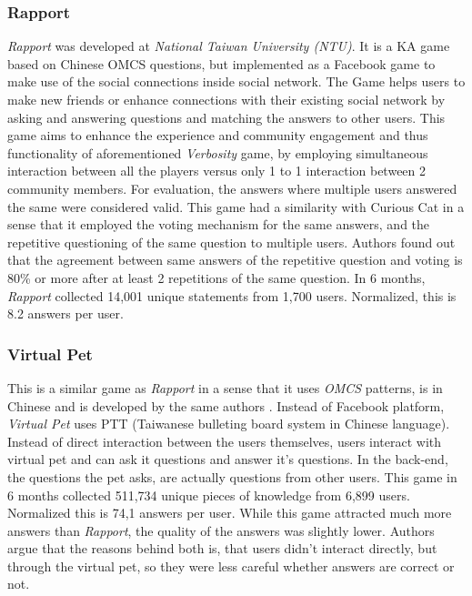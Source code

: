\subsubsection{Rapport}
\label{section:r:rapport} 
\emph{Rapport} was developed at \emph{National Taiwan University (NTU)}. It
is a KA game based on Chinese OMCS questions, but implemented as a 
Facebook game to make use of the social connections inside social network. 
The Game helps users to make new friends or enhance connections with their 
existing social network by asking and answering questions and matching the 
answers to other users\parencite{Kuo2009}. This game aims to enhance the 
experience and community engagement and thus functionality of aforementioned 
\emph{Verbosity} game, by employing simultaneous  interaction between all the 
players versus only 1 to 1 interaction between 2 community members. For 
evaluation, the answers where multiple users answered the same were considered 
valid. This game had a similarity with Curious Cat in a sense that it employed
the voting mechanism for the same answers, and the repetitive questioning of
the same question to multiple users. Authors found out that the agreement 
between same answers of the repetitive question and voting is 80\% or more 
after at least 2 repetitions of the same question. In 6 months, \emph{Rapport}
collected 14,001 unique statements from 1,700 users. Normalized, this is
8.2 answers per user.

\subsubsection{Virtual Pet}
\label{section:r:virtualpet} 
This is a similar game as \emph{Rapport} in a sense that it
uses \emph{OMCS} patterns, is in Chinese and is developed by the same authors
\parencite{Kuo2009}. Instead of Facebook platform, \emph{Virtual Pet} uses
PTT (Taiwanese bulleting board system in Chinese language). Instead of direct
interaction between the users themselves, users interact with virtual pet and
can ask it questions and answer it's questions. In the back-end, the questions
the pet asks, are actually questions from other users. This game in 6 months 
collected 511,734 unique pieces of knowledge from 6,899 users. Normalized this
is 74,1 answers per user. While this game attracted much more answers than 
\emph{Rapport}, the quality of the answers was slightly lower. Authors
argue that the reasons behind both is, that users didn't interact directly,
but through the virtual pet, so they were less careful whether answers are
correct or not.

